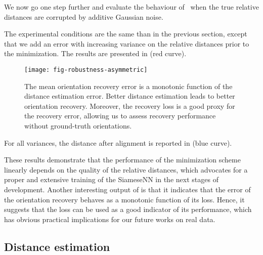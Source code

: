 We now go one step further and evaluate the behaviour of~ when the true relative distances are corrupted by  additive Gaussian noise.

The experimental conditions are the same than in the previous section, except that we add an error with increasing variance on the relative distances prior to the minimization.
The results are presented in  (red curve).

\begin{figure}
    \centering
    \texttt{[image: fig-robustness-asymmetric]}
    \caption{
        The mean orientation recovery error  is a monotonic function of the distance estimation error.
        Better distance estimation leads to better orientation recovery.
        Moreover, the recovery loss  is a good proxy for the recovery error, allowing us to assess recovery performance without ground-truth orientations.
}
    \label{fig:recovery-noise-distances}
\end{figure}

For all variances, the distance after alignment is reported in  (blue curve).

These results demonstrate that the performance of the minimization scheme~ linearly depends on the quality of the relative distances, which advocates for a proper and extensive training of the SiameseNN in the next stages of development.
Another interesting output of  is that it indicates that the error of the orientation recovery behaves as a monotonic function of its loss.
Hence, it suggests that the loss can be used as a good indicator of its performance, which has obvious practical implications for our future works on real data.

\subsection{Distance estimation}\label{sec:results:distance-estimation}

